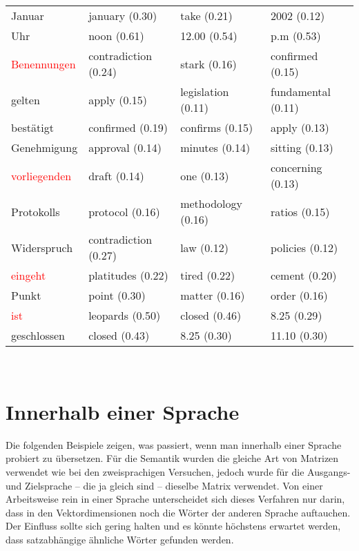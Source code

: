 \documentclass[11pt,twoside,openright]{mpreport}
\begin{document}
\begin{scriptsize}
\begin{tabular}{|llll|}
Januar                  & january (0.30) & take (0.21) & 2002 (0.12) \\ %
Uhr                     & noon (0.61) & 12.00 (0.54) & p.m (0.53) \\ %
\textcolor{red}{Benennungen}             & contradiction (0.24) & stark (0.16) & confirmed (0.15) \\
gelten                  & apply (0.15) & legislation (0.11) & fundamental (0.11) \\ %
bestätigt              & confirmed (0.19) & confirms (0.15) & apply (0.13) \\ %
Genehmigung             & approval (0.14) & minutes (0.14) & sitting (0.13) \\ %
\textcolor{red}{vorliegenden}            & draft (0.14) & one (0.13) & concerning (0.13) \\
Protokolls              & protocol (0.16) & methodology (0.16) & ratios (0.15) \\ %
Widerspruch             & contradiction (0.27) & law (0.12) & policies (0.12) \\ %
\textcolor{red}{eingeht}                 & platitudes (0.22) & tired (0.22) & cement (0.20) \\
Punkt                   & point (0.30) & matter (0.16) & order (0.16) \\ %
\textcolor{red}{ist}                     & leopards (0.50) & closed (0.46) & 8.25 (0.29) \\
geschlossen             & closed (0.43) & 8.25 (0.30) & 11.10 (0.30) \\ %
\hline
\end{tabular}\end{scriptsize}\\



\section{Innerhalb einer Sprache}
Die folgenden Beispiele zeigen, was passiert, wenn man innerhalb einer Sprache probiert zu übersetzen. Für die Semantik wurden die gleiche Art von Matrizen verwendet wie bei den zweisprachigen Versuchen, jedoch wurde für die Ausgangs- und Zielsprache -- die ja gleich sind -- dieselbe Matrix verwendet. Von einer Arbeitsweise rein in einer Sprache unterscheidet sich dieses Verfahren nur darin, dass in den Vektordimensionen noch die Wörter der anderen Sprache auftauchen. Der Einfluss sollte sich gering halten und es könnte höchstens erwartet werden, dass satzabhängige ähnliche Wörter gefunden werden.
\end{document}
